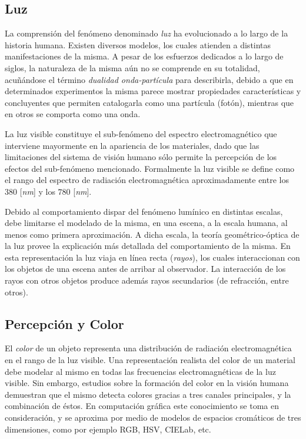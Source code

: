 \subsection{Luz}%
La comprensión del fenómeno denominado {\em luz} ha evolucionado a lo largo de la historia humana.
Existen diversos modelos, los cuales atienden a distintas manifestaciones de la misma.
A pesar de los esfuerzos dedicados a lo largo de siglos, la naturaleza de la misma aún no se comprende en su totalidad, acuñándose el término {\em dualidad onda-partícula} para describirla, debido a que en determinados experimentos la misma parece mostrar propiedades características y concluyentes que permiten catalogarla como una partícula (fotón), mientras que en otros se comporta como una onda.

La luz visible constituye el sub-fenómeno del espectro electromagnético que interviene mayormente en la apariencia de los materiales, dado que las limitaciones del sistema de visión humano sólo permite la percepción de los efectos del sub-fenómeno mencionado.
Formalmente la luz visible se define como el rango del espectro de radiación electromagnética aproximadamente entre los  $380$ [{\em nm}] y los $780$ [{\em nm}].

Debido al comportamiento dispar del fenómeno lumínico en distintas escalas, debe limitarse el modelado de la misma, en una escena, a la escala humana, al menos como primera aproximación.
A dicha escala, la teoría geométrico-óptica de la luz provee la explicación más detallada del comportamiento de la misma.
En esta representación la luz viaja en línea recta ({\em rayos}), los cuales interaccionan con los objetos de una escena antes de arribar al observador.
La interacción de los rayos con otros objetos produce además rayos secundarios (de refracción, entre otros).

\subsection{Percepción y Color}
El {\em color} de un objeto representa una distribución de radiación electromagnética en el rango de la luz visible.
Una representación realista del color de un material debe modelar al mismo en todas las frecuencias electromagnéticas de la luz visible.
Sin embargo, estudios sobre la formación del color en la visión humana demuestran que el mismo detecta colores gracias a tres canales principales, y la combinación de éstos.
En computación gráfica este conocimiento se toma en consideración, y se aproxima por medio de modelos de espacios cromáticos de tres dimensiones, como por ejemplo \acrshort{RGB}, \acrshort{HSV}, CIELab, etc.

